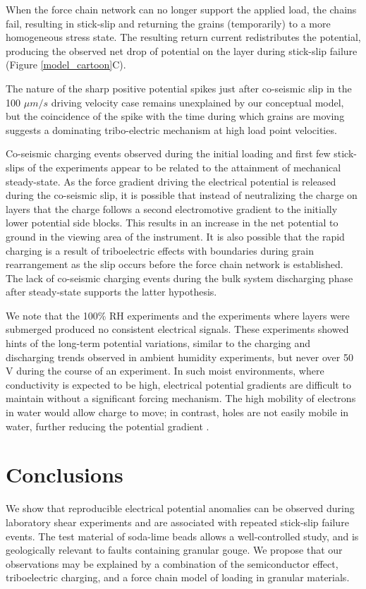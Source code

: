When the force chain network can no longer support the applied load, the chains fail, resulting in stick-slip and returning the grains (temporarily) to a more homogeneous stress state.  The resulting return current redistributes the potential, producing the observed net drop of potential on the layer during stick-slip failure (Figure \ref{model_cartoon}C).  

The nature of the sharp positive potential spikes just after co-seismic slip in the 100 $\mu m/s$ driving velocity case remains unexplained by our conceptual model, but the coincidence of the spike with the time during which grains are moving suggests a dominating tribo-electric mechanism at high load point velocities.

Co-seismic charging events observed during the initial loading and first few stick-slips of the experiments appear to be related to the attainment of mechanical steady-state.  As the force gradient driving the electrical potential is released during the co-seismic slip, it is possible that instead of neutralizing the charge on layers that the charge follows a second electromotive gradient to the initially lower potential side blocks.  This results in an increase in the net potential to ground in the viewing area of the instrument.  It is also possible that the rapid charging is a result of triboelectric effects with boundaries during grain rearrangement as the slip occurs before the force chain network is established.  The lack of co-seismic charging events during the bulk system discharging phase after steady-state supports the latter hypothesis.

We note that the 100\% RH experiments and the experiments where layers were submerged produced no consistent electrical signals. These experiments showed hints of the long-term potential variations, similar to the charging and discharging trends observed in ambient humidity experiments, but never over 50 V during the course of an experiment.  In such moist environments, where conductivity is expected to be high, electrical potential gradients are difficult to maintain without a significant forcing mechanism.  The high mobility of electrons in water would allow charge to move; in contrast, holes are not easily mobile in water, further reducing the potential gradient \citep{Balk:2009hu}.

\section{Conclusions}
We show that reproducible electrical potential anomalies can be observed during laboratory shear experiments and are associated with repeated stick-slip failure events.  The test material of soda-lime beads allows a well-controlled study, and is geologically relevant to faults containing granular gouge.  We propose that our observations may be explained by a combination of the semiconductor effect, triboelectric charging, and a force chain model of loading in granular materials.  

